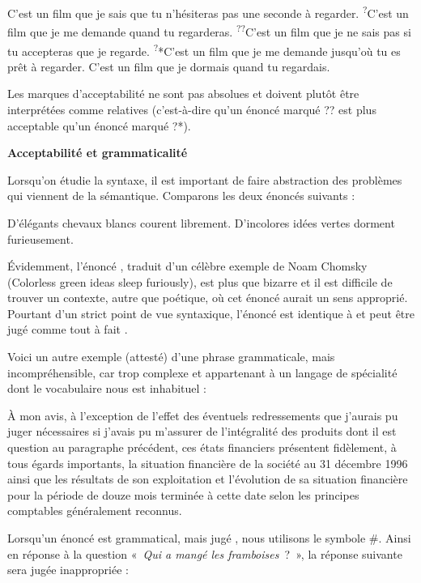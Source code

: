 \ea
\ea  C’est un film que je sais que tu n’hésiteras pas une seconde à regarder.
\ex \textsuperscript{?}C’est un film que je me demande quand tu regarderas.
\ex \textsuperscript{??}C’est un film que je ne sais pas si tu accepteras que je regarde.
\ex \textsuperscript{?}*C’est un film que je me demande jusqu’où tu es prêt à regarder.
\ex *C’est un film que je dormais quand tu regardais.
\z
\z

Les marques d’acceptabilité ne sont pas absolues et doivent plutôt être interprétées comme relatives (c’est-à-dire qu’un énoncé marqué ?? est plus acceptable qu’un énoncé marqué ?*).

{\bfseries
Acceptabilité et grammaticalité
}

Lorsqu’on étudie la syntaxe, il est important de faire abstraction des problèmes qui viennent de la sémantique. Comparons les deux énoncés suivants :

\ea
\ea D’élégants chevaux blancs courent librement.
\ex D’incolores idées vertes dorment furieusement.
\z
\z

Évidemment, l’énoncé , traduit d’un célèbre exemple de Noam Chomsky (Colorless green ideas sleep furiously), est plus que bizarre et il est difficile de trouver un contexte, autre que poétique, où cet énoncé aurait un sens approprié. Pourtant d’un strict point de vue syntaxique, l’énoncé  est identique à  et peut être jugé comme tout à fait .

Voici un autre exemple (attesté) d’une phrase grammaticale, mais incompréhensible, car trop complexe et appartenant à un langage de spécialité dont le vocabulaire nous est inhabituel :

\ea
À mon avis, à l’exception de l’effet des éventuels redressements que j’aurais pu juger nécessaires si j’avais pu m’assurer de l’intégralité des produits dont il est question au paragraphe précédent, ces états financiers présentent fidèlement, à tous égards importants, la situation financière de la société au 31 décembre 1996 ainsi que les résultats de son exploitation et l’évolution de sa situation financière pour la période de douze mois terminée à cette date selon les principes comptables généralement reconnus.
\z

Lorsqu’un énoncé est grammatical, mais jugé , nous utilisons le symbole \#. Ainsi en réponse à la question «~\textit{Qui a mangé les framboises~}?~», la réponse suivante sera jugée inappropriée :

